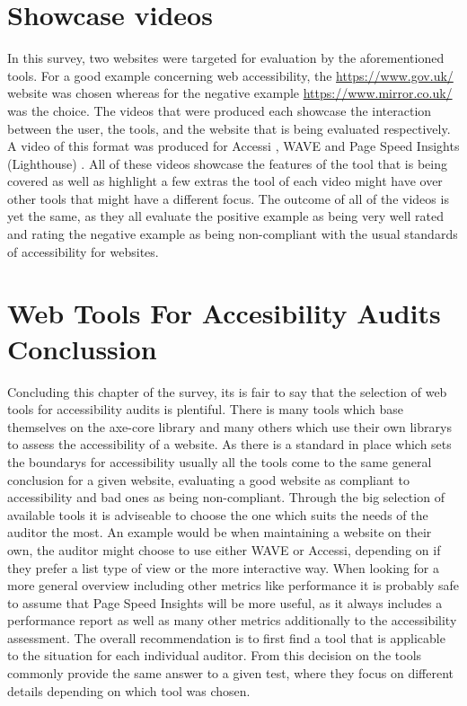 \section{Showcase videos}

In this survey, two websites were targeted for evaluation by the
aforementioned tools. For a good example concerning web accessibility,
the \url{https://www.gov.uk/} website was chosen whereas for the
negative example \url{https://www.mirror.co.uk/} was the choice. The
videos that were produced each showcase the interaction between the
user, the tools, and the website that is being evaluated
respectively. A video of this format was produced for Accessi
\parencite{Accessi_vid}, WAVE \parencite{WAVE_vid} and Page Speed
Insights (Lighthouse) \parencite{PageSpeedInsights_vid}. All of these
videos showcase the features of the tool that is being covered as well
as highlight a few extras the tool of each video might have over other
tools that might have a different focus. The outcome of all of the
videos is yet the same, as they all evaluate the positive example as
being very well rated and rating the negative example as being
non-compliant with the usual standards of accessibility for websites.



\section{Web Tools For Accesibility Audits Conclussion}

Concluding this chapter of the survey, its is fair to say that the
selection of web tools for accessibility audits is plentiful. There is
many tools which base themselves on the axe-core library and many
others which use their own librarys to assess the accessibility of a
website. As there is a standard in place which sets the boundarys for
accessibility usually all the tools come to the same general
conclusion for a given website, evaluating a good website as compliant
to accessibility and bad ones as being non-compliant. Through the big
selection of available tools it is adviseable to choose the one which
suits the needs of the auditor the most. An example would be when
maintaining a website on their own, the auditor might choose to use
either WAVE or Accessi, depending on if they prefer a list type of
view or the more interactive way. When looking for a more general
overview including other metrics like performance it is probably safe
to assume that Page Speed Insights will be more useful, as it always
includes a performance report as well as many other metrics
additionally to the accessibility assessment. The overall
recommendation is to first find a tool that is applicable to the
situation for each individual auditor. From this decision on the tools
commonly provide the same answer to a given test, where they focus on
different details depending on which tool was chosen.


